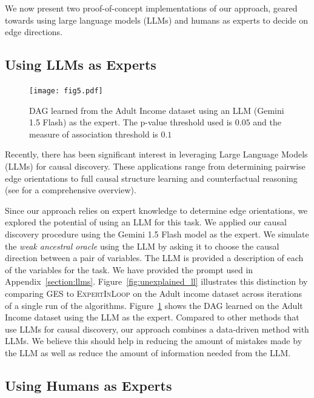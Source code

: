 \documentclass{uai2025} %
\begin{document}
\label{sec:web}

We now present two proof-of-concept implementations of our approach, 
geared towards using  large language models (LLMs) and humans as experts
to decide on edge directions.

\subsection{Using LLMs as Experts}
 
\begin{figure}[t!]
	\centering
	\texttt{[image: fig5.pdf]}
	\caption{DAG learned from the Adult Income dataset using an LLM
		(Gemini 1.5 Flash) as the expert. The p-value threshold used is $ 0.05 $ 
		and the measure of association threshold is $ 0. 1 $}
	\label{fig:adult_llm}
\end{figure}

Recently, there has been significant interest in leveraging Large Language
Models (LLMs) for causal discovery. These applications range from determining
pairwise edge orientations \citep{Kiciman2023, Jin2024} to full causal
structure learning \citep{Naik2023, Vashishtha2023} and counterfactual
reasoning \citep{Kiciman2023} (see \citet{Liu2024} for a comprehensive
overview).

Since our approach relies on expert knowledge to determine edge orientations,
we explored the potential of using an LLM for this task. We applied our causal
discovery procedure using the Gemini 1.5 Flash model as the expert. We simulate
the \emph{weak ancestral oracle} using the LLM by asking it to choose the
causal direction between a pair of variables. The LLM is provided a description
of each of the variables for the task. We have provided the prompt used in
Appendix~\ref{section:llms}. 
Figure~\ref{fig:unexplained_ll} illustrates this distinction by comparing GES
to \textsc{ExpertInLoop} on the Adult income dataset across iterations of a
single run of the algorithms.
Figure~\ref{fig:adult_llm} shows the DAG learned
on the Adult Income dataset using the LLM as the expert. Compared to other
methods that use LLMs for causal discovery, our approach combines a data-driven
method with LLMs. We believe this should help in reducing the amount of
mistakes made by the LLM as well as reduce the amount of information needed
from the LLM.


\subsection{Using Humans as Experts}
\end{document}

